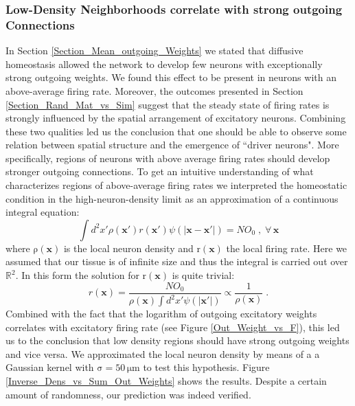\documentclass[10pt,a4paper]{article}
\begin{document}
\subsubsection{Low-Density Neighborhoods correlate with strong outgoing Connections}
In Section \ref{Section_Mean_outgoing_Weights} we stated that diffusive homeostasis allowed the network to develop few neurons with exceptionally strong outgoing weights. We found this effect to be present in neurons with an above-average firing rate. Moreover, the outcomes presented in Section \ref{Section_Rand_Mat_vs_Sim} suggest that the steady state of firing rates is strongly influenced by the spatial arrangement of excitatory neurons. Combining these two qualities led us the conclusion that one should be able to observe some relation between spatial structure and the emergence of ``driver neurons". More specifically, regions of neurons with above average firing rates should develop stronger outgoing connections. To get an intuitive understanding of what characterizes regions of above-average firing rates we interpreted the homeostatic condition in the high-neuron-density limit as an approximation of a continuous integral equation:
\begin{equation}
\int d^2 x' \rho(\mathbf{x}') r(\mathbf{x}') \psi(|\mathbf{x}-\mathbf{x}'|) = NO_0 \; , \; \forall \, \mathbf{x}
\label{Density_Limit_Hom}
\end{equation}
where $\mathrm{\rho(\mathbf{x})}$ is the local neuron density and $\mathrm{r(\mathbf{x})}$ the local firing rate. Here we assumed that our tissue is of infinite size and thus the integral is carried out over $\mathbb{R}^2$. In this form the solution for $\mathrm{r(\mathbf{x})}$ is quite trivial:
\begin{equation}
r(\mathbf{x}) = \frac{NO_0}{\rho(\mathbf{x}) \int d^2 x' \psi(|\mathbf{x}'|)} \propto \frac{1}{\rho(\mathbf{x})} \; .
\label{Density_Limit_Hom_Solution}
\end{equation}
Combined with the fact that the logarithm of outgoing excitatory weights correlates with excitatory firing rate (see Figure \ref{Out_Weight_vs_F}), this led us to the conclusion that low density regions should have strong outgoing weights and vice versa. We approximated the local neuron density by means of a a Gaussian kernel with $\mathrm{\sigma = 50\, \mu m}$ to test this hypothesis. Figure \ref{Inverse_Dens_vs_Sum_Out_Weights} shows the results. Despite a certain amount of randomness, our prediction was indeed verified. 
\end{document}

